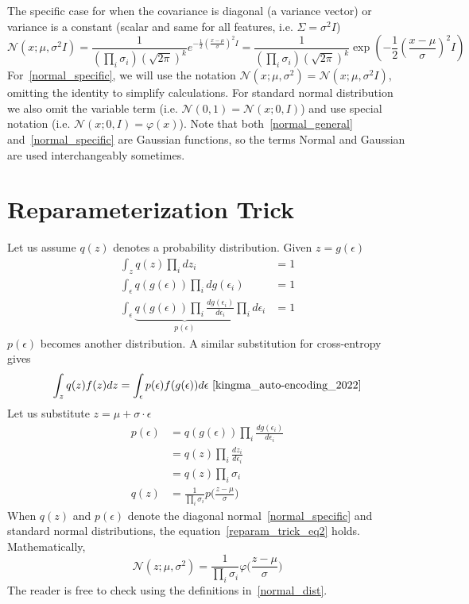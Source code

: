 \documentclass{book}
\numberwithin{equation}{subsection}
\begin{document}
The specific case for when the covariance is diagonal (a variance vector) or variance is a constant (scalar and same for all features, i.e. $\Sigma = \sigma^2 I$)
\begin{equation}
    \mathcal{N}(x; \mu, \sigma^2I) = \frac {1}{(\prod_i \sigma_i)(\sqrt{2\pi})^k} e^{-{\frac {1}{2}}\left(\frac {x-\mu}{\sigma}\right)^2 I} = \frac {1}{(\prod_i \sigma_i)(\sqrt{2\pi})^k} \exp\left(-{\frac {1}{2}}\left(\frac {x-\mu}{\sigma}\right)^2 I\right) \label{normal_specific}
\end{equation}
For~\ref{normal_specific}, we will use the notation $\mathcal{N}(x; \mu, \sigma^2) = \mathcal{N}(x; \mu, \sigma^2I)$, omitting the identity to simplify calculations. For standard normal distribution we also omit the variable term (i.e. $\mathcal{N}(0, 1)=\mathcal{N}(x; 0, I)$) and use special notation (i.e. $\mathcal{N}(x; 0, I)=\mathcal{\varphi}(x)$). Note that both~\ref{normal_general} and~\ref{normal_specific} are Gaussian functions, so the terms Normal and Gaussian are used interchangeably sometimes.
\section{Reparameterization Trick}
\label{reparam_trick}
Let us assume $q(z)$ denotes a probability distribution. Given $z = g(\epsilon)$
\begin{align}
    \int_z q(z)\prod_i dz_i &= 1\\
    \int_\epsilon q(g(\epsilon))\prod_i dg(\epsilon_i) &= 1\\
    \int_\epsilon \underbrace{q(g(\epsilon))\prod_i \frac{dg(\epsilon_i)}{d\epsilon_i}}_{p(\epsilon)}\prod_i d\epsilon_i &= 1
\end{align}
$p(\epsilon)$ becomes another distribution. A similar substitution for cross-entropy gives
\begin{equation}
    \int_z q(z)f(z)dz = \int_\epsilon p(\epsilon)f(g(\epsilon))d\epsilon~\cite{kingma_auto-encoding_2022}\label{reparam_trick_eq1}
\end{equation}
Let us substitute $z=\mu+\sigma \cdot \epsilon$
\begin{align}
    p(\epsilon)
    &= q(g(\epsilon))\prod_i \frac{dg(\epsilon_i)}{d\epsilon_i}\\
    &= q(z)\prod_i \frac{dz_i}{d\epsilon_i}\\
    &= q(z)\prod_i \sigma_i\\
    q(z) &= \frac{1}{\prod_i \sigma_i}p\Big(\frac{z-\mu}{\sigma}\Big)\label{reparam_trick_eq2}
\end{align}
When $q(z)$ and $p(\epsilon)$ denote the diagonal normal~\ref{normal_specific} and standard normal distributions, the equation~\ref{reparam_trick_eq2} holds. Mathematically,
\begin{equation}
    \mathcal{N}(z;\mu, \sigma^2) = \frac{1}{\prod_i \sigma_i}\varphi\Big(\frac{z-\mu}{\sigma}\Big)
\end{equation}
The reader is free to check using the definitions in~\ref{normal_dist}.
\end{document}
